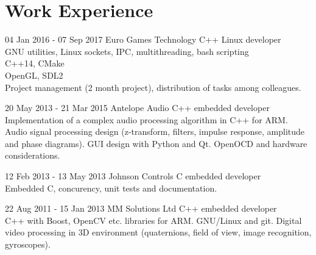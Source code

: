 \documentclass{tccv}
\begin{document}
\section{Work Experience}
\begin{eventlist}
\item{04 Jan 2016 - 07 Sep 2017}
     {Euro Games Technology}
     {C++ Linux developer}                                         \\
GNU utilities, Linux sockets, IPC, multithreading, bash scripting  \\
C++14, CMake                                                       \\
OpenGL, SDL2                                                       \\
Project management (2 month project), distribution of tasks among colleagues.

\item{20 May 2013 - 21 Mar 2015}
     {Antelope Audio}
     {C++ embedded developer}          \\
Implementation of a complex audio processing algorithm in C++ for ARM.
Audio signal processing design (z-transform, filters, impulse response, amplitude and phase diagrams).
GUI design with Python and Qt.
OpenOCD and hardware considerations.   \\

\item{12 Feb 2013 - 13 May 2013}
     {Johnson Controls}
     {C embedded developer} \\
Embedded C, concurency, unit tests and documentation.  \\

\item{22 Aug 2011 - 15 Jan 2013}
     {MM Solutions Ltd}
     {C++ embedded developer} \\
C++ with Boost, OpenCV etc. libraries for ARM.
GNU/Linux and git.
Digital video processing in 3D environment (quaternions, field of view, image recognition, gyroscopes).
\end{eventlist}
\end{document}
